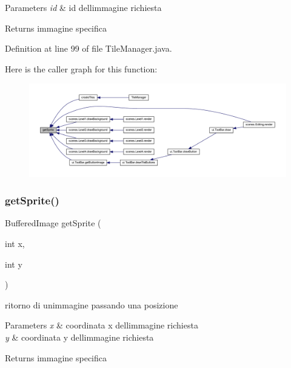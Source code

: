 \begin{DoxyParams}{Parameters}
{\em id} & id dell\textquotesingle{}immagine richiesta\\
\hline
\end{DoxyParams}
\begin{DoxyReturn}{Returns}
immagine specifica 
\end{DoxyReturn}


Definition at line 99 of file Tile\+Manager.\+java.

Here is the caller graph for this function\+:\nopagebreak
\begin{figure}[H]
\begin{center}
\leavevmode
\includegraphics[width=350pt]{classmanagers_1_1_tile_manager_a46ebd32c7ec4ac506010fe465687bdd7_icgraph}
\end{center}
\end{figure}
\mbox{\label{classmanagers_1_1_tile_manager_a96613c34a7cfb5341cc3c6a4fe3612a1}} 
\subsubsection{\texorpdfstring{get\+Sprite()}{getSprite()}\hspace{0.1cm}{\footnotesize\ttfamily [2/2]}}
{\footnotesize\ttfamily Buffered\+Image get\+Sprite (\begin{DoxyParamCaption}\item[{int}]{x,  }\item[{int}]{y }\end{DoxyParamCaption})\hspace{0.3cm}{\ttfamily [private]}}



ritorno di un\textquotesingle{}immagine passando una posizione 


\begin{DoxyParams}{Parameters}
{\em x} & coordinata x dell\textquotesingle{}immagine richiesta \\
\hline
{\em y} & coordinata y dell\textquotesingle{}immagine richiesta\\
\hline
\end{DoxyParams}
\begin{DoxyReturn}{Returns}
immagine specifica 
\end{DoxyReturn}


